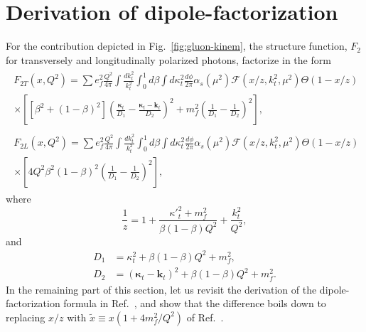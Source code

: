 \documentclass[11pt]{article}
\numberwithin{equation}{section}
\numberwithin{table}{section}
\numberwithin{figure}{section}
\begin{document}
\section{Derivation of dipole-factorization}
For the contribution depicted in Fig.~\ref{fig:gluon-kinem}, the structure function, $F_2$ for transversely and longitudinally polarized photons, factorize in the form~\cite{Kimber:2001uaa} 
\begin{align}
	\begin{split}
		F_{2T}(x,Q^2)=\sum e^2_f\frac{Q^2}{4\pi}\int\frac{d k_t^2}{k_t^2}\int^1_0 d\beta\int d \kappa_t ^2 \frac{d\phi}{2\pi}\alpha_s(\mu^2)\mathcal{F}(x/z,k^2_t,\mu^2)\Theta(1-x/z)&\\
		\times\left[
		\left[\beta^2+(1-\beta)^2\right]
		\left(\frac{\boldsymbol{\kappa}_t}{D_1}-\frac{\boldsymbol{\kappa}_t-\mathbf{k}_t}{D_2}\right)^2
		+m_f^2\left(\frac{1}{D_1}-\frac{1}{D_2}\right)^2
		\right],&
		\label{eq:angle-unintegratedT}
	\end{split}\\
	\begin{split}
		F_{2L}(x,Q^2)=\sum e^2_f\frac{Q^2}{4\pi}\int\frac{d k_t^2}{k_t^2}\int^1_0 d\beta\int d \kappa_t ^2 \frac{d\phi}{2\pi}\alpha_s(\mu^2)\mathcal{F}(x/z,k^2_t,\mu^2)\Theta(1-x/z)&\\
		\times\left[
		4Q^2\beta^2 (1-\beta)^2\left(\frac{1}{D_1}-\frac{1}{D_2}\right)^2
		\right],&
		\label{eq:angle-unintegratedL}
	\end{split}
\end{align}
where
\begin{equation}
	\frac{1}{z}=1+\frac{{\kappa'}^2_t+m_f^2}{\beta(1-\beta)Q^2}+\frac{k^2_t}{Q^2},
	\label{eq:z}
\end{equation}
and
\begin{equation}
	\begin{split}
		D_1&=\kappa_t^2+\beta(1-\beta)Q^2+m_f^2,\\
		D_2&=(\boldsymbol{\kappa}_t-\mathbf{k}_t)^2+\beta(1-\beta)Q^2+m_f^2.
	\end{split}
\end{equation}
In the remaining part of this section, let us revisit the derivation of the dipole-factorization formula in Ref.~\cite{Bartels:2002cj}, and show that the difference boils down to replacing $x/z$ with $\tilde{x}\equiv x\left(1+4m_f^2/Q^2\right)$ of Ref.~\cite{Golec-Biernat:1998zce}. 
\end{document}
